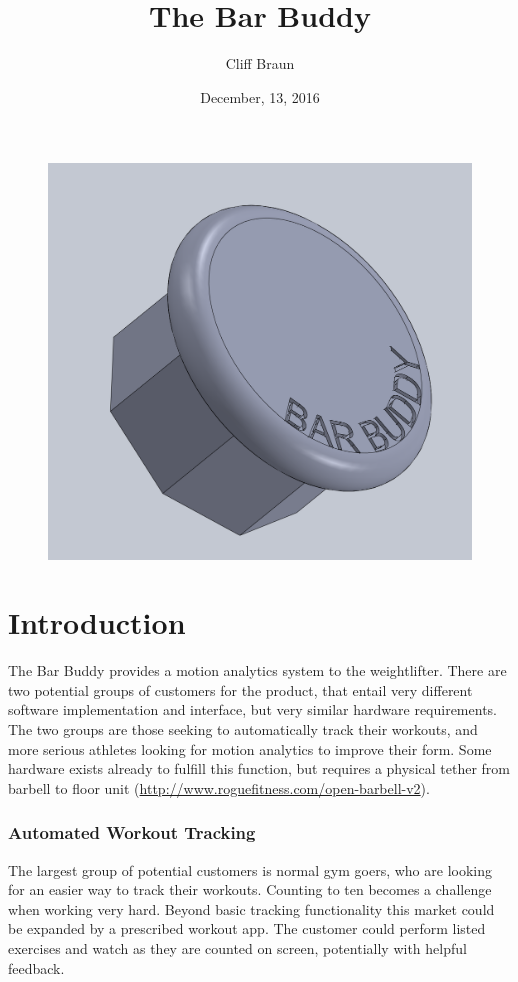 \documentclass[11pt,oneside]{amsart}
\title{The Bar Buddy}
\author{Cliff Braun}
\date{December, 13, 2016}                                           %
\begin{document}
\maketitle

\begin{figure}[htbp]
\begin{center}
\includegraphics[width=\textwidth]{figures/barbuddy.png}
\end{center}
\end{figure}

\newpage
\tableofcontents
\section{Introduction}
The Bar Buddy provides a motion analytics system to the weightlifter. There are two potential groups of customers for the product, that entail very different software implementation and interface, but very similar hardware requirements. The two groups are those seeking to automatically track their workouts, and more serious athletes looking for motion analytics to improve their form. Some hardware exists already to fulfill this function, but requires a physical tether from barbell to floor unit (\url{http://www.roguefitness.com/open-barbell-v2}).
\subsubsection{Automated Workout Tracking}
The largest group of potential customers is normal gym goers, who are looking for an easier way to track their workouts. Counting to ten becomes a challenge when working very hard. Beyond basic tracking functionality this market could be expanded by a prescribed workout app. The customer could perform listed exercises and watch as they are counted on screen, potentially with helpful feedback.
\end{document}
